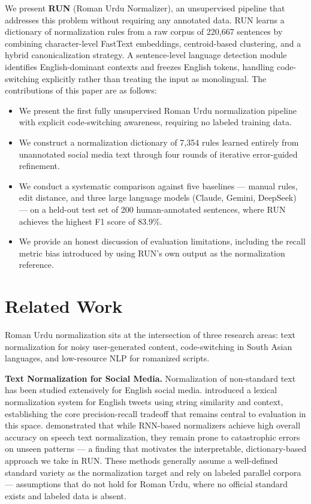 \documentclass[11pt]{article}
\begin{document}
We present \textbf{RUN} (Roman Urdu Normalizer), an unsupervised pipeline that addresses this problem without requiring any annotated data. RUN learns a dictionary of normalization rules from a raw corpus of 220,667 sentences by combining character-level FastText embeddings, centroid-based clustering, and a hybrid canonicalization strategy. A sentence-level language detection module identifies English-dominant contexts and freezes English tokens, handling code-switching explicitly rather than treating the input as monolingual.
The contributions of this paper are as follows:
\begin{itemize}
\setlength{\itemsep}{0pt}
\setlength{\parsep}{0pt}
\setlength{\parskip}{0pt}
    \item We present the first fully unsupervised Roman Urdu normalization pipeline with explicit code-switching awareness, requiring no labeled training data.
    \item We construct a normalization dictionary of 7,354 rules learned entirely from unannotated social media text through four rounds of iterative error-guided refinement.
    \item We conduct a systematic comparison against five baselines — manual rules, edit distance, and three large language models (Claude, Gemini, DeepSeek) — on a held-out test set of 200 human-annotated sentences, where RUN achieves the highest F1 score of 83.9\%.
    \item We provide an honest discussion of evaluation limitations, including the recall metric bias introduced by using RUN's own output as the normalization reference.
\end{itemize}


\section{Related Work}
Roman Urdu normalization sits at the intersection of three research areas: text normalization for noisy user-generated content, code-switching in South Asian languages, and low-resource NLP for romanized scripts.

\textbf{Text Normalization for Social Media.} Normalization of non-standard text has been studied extensively for English social media. \citet{han2011lexical} introduced a lexical normalization system for English tweets using string similarity and context, establishing the core precision-recall tradeoff that remains central to evaluation in this space. \citet{sproat2017rnn} demonstrated that while RNN-based normalizers achieve high overall accuracy on speech text normalization, they remain prone to catastrophic errors on unseen patterns — a finding that motivates the interpretable, dictionary-based approach we take in RUN. These methods generally assume a well-defined standard variety as the normalization target and rely on labeled parallel corpora — assumptions that do not hold for Roman Urdu, where no official standard exists and labeled data is absent.
\end{document}
